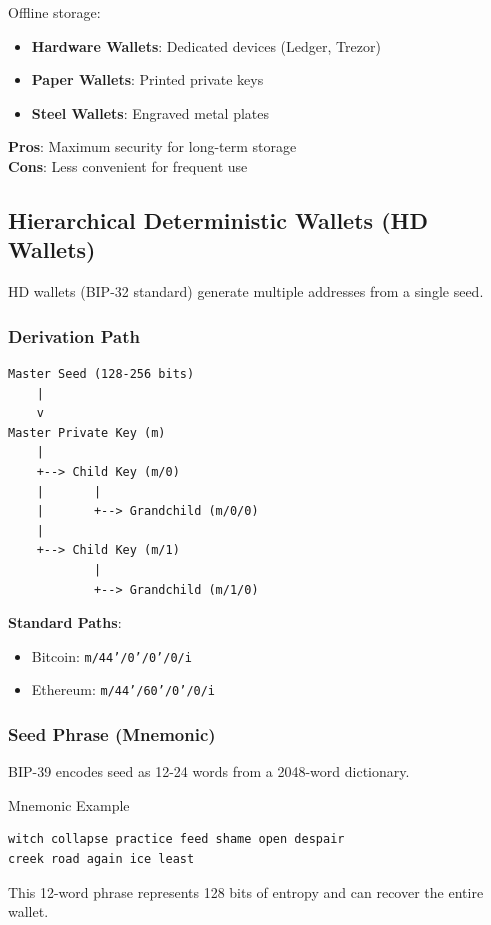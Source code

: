 \documentclass[11pt,a4paper]{article}
\begin{document}
Offline storage:
\begin{itemize}
  \item \textbf{Hardware Wallets}: Dedicated devices (Ledger, Trezor)
  \item \textbf{Paper Wallets}: Printed private keys
  \item \textbf{Steel Wallets}: Engraved metal plates
\end{itemize}

\textbf{Pros}: Maximum security for long-term storage \\
\textbf{Cons}: Less convenient for frequent use

\subsection{Hierarchical Deterministic Wallets (HD Wallets)}

HD wallets (BIP-32 standard) generate multiple addresses from a single seed.

\subsubsection{Derivation Path}

\begin{verbatim}
Master Seed (128-256 bits)
    |
    v
Master Private Key (m)
    |
    +--> Child Key (m/0)
    |       |
    |       +--> Grandchild (m/0/0)
    |
    +--> Child Key (m/1)
            |
            +--> Grandchild (m/1/0)
\end{verbatim}

\textbf{Standard Paths}:
\begin{itemize}
  \item Bitcoin: \texttt{m/44'/0'/0'/0/i}
  \item Ethereum: \texttt{m/44'/60'/0'/0/i}
\end{itemize}

\subsubsection{Seed Phrase (Mnemonic)}

BIP-39 encodes seed as 12-24 words from a 2048-word dictionary.

\begin{examplebox}{Mnemonic Example}
\begin{verbatim}
witch collapse practice feed shame open despair
creek road again ice least
\end{verbatim}

This 12-word phrase represents 128 bits of entropy and can recover the entire wallet.
\end{examplebox}
\end{document}
